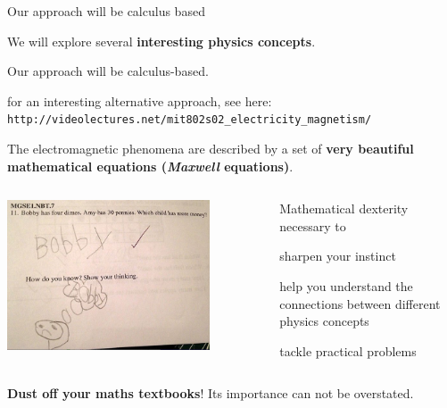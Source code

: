 \begin{frame}{Our approach will be calculus based}

\begin{itemize}
{
      \item We will explore several {\bf interesting physics concepts}.
      \item Our approach will be calculus-based.
      \begin{itemize}
      {
         \item for an interesting alternative approach, see here:\\
                    {\color{blue} \tt http://videolectures.net/mit802s02\_electricity\_magnetism/}
      }
      \end{itemize}
      \item The electromagnetic phenomena are described by a set of {\bf very beautiful
                mathematical equations ({\em Maxwell} equations)}.
}
\end{itemize}


\begin{columns}
  \begin{column}{0.45\textwidth}
   \begin{center}
     \includegraphics[width=0.80\textwidth]{./images/photos/bobby.png}\\
   \end{center}
  \end{column}
  \begin{column}{0.55\textwidth}
  {\small
         Mathematical dexterity necessary to
         \begin{itemize}
          { \small
                 \item sharpen your instinct
                 \item help you understand the connections between
                   different physics concepts
                  \item tackle practical problems
          }
         \end{itemize}
   }
  \end{column}
\end{columns}

\vspace{0.25cm}
{\bf Dust off your maths textbooks}! Its importance can not be overstated.\\

\end{frame}


